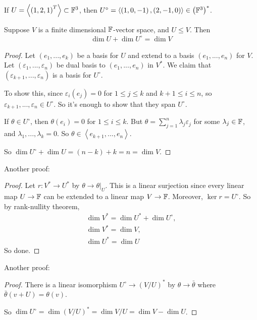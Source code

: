\documentclass[a4paper]{article}
\begin{document}
\begin{eg}
If $U=\left<\left(1,2,1\right)^T\right> \subset \mathbb{F}^3$, then $U^\circ = \left<\left(1,0,-1\right),\left(2,-1,0\right)\right> \in \left(\mathbb{F}^3\right)^*$.
\end{eg}

\begin{prop}
Suppose $V$ is a finite dimensional $\mathbb{F}$-vector space, and $U \leq V$. Then
\begin{equation*}
\begin{aligned}
\dim U + \dim U^\circ = \dim V
\end{aligned}
\end{equation*}
\begin{proof}
Let $\left(e_1,...,e_k\right)$ be a basis for $U$ and extend to a basis $\left(e_1,...,e_n\right)$ for $V$. Let $\left(\varepsilon_1,...,\varepsilon_n\right)$ be dual basis to $\left(e_1,...,e_n\right)$ in $V^*$. We claim that $\left(\varepsilon_{k+1},...,\varepsilon_n\right)$ is a basis for $U^\circ$.

To show this, since $\varepsilon_i\left(e_j\right) = 0$ for $1\leq j\leq k$ and $k+1 \leq i \leq n$, so $\varepsilon_{k+1},...,\varepsilon_n \in U^\circ$. So it's enough to show that they span $U^\circ$.

If $\theta\in U^\circ$, then $\theta\left(e_i\right) = 0$ for $1 \leq i \leq k$. But $\theta = \sum_{j=1}^n \lambda_j \varepsilon_j$ for some $\lambda_j \in \mathbb{F}$, and $\lambda_1,...,\lambda_k = 0$. So $\theta \in \left<e_{k+1},...,e_n\right>$.

So $\dim U^\circ + \dim U = \left(n-k\right)+k=n=\dim V$.
\end{proof}

Another proof:
\begin{proof}
Let $r: V^* \to U^*$ by $\theta \to \theta|_U$. This is a linear surjection since every linear map $U \to \mathbb{F}$ can be extended to a linear map $V \to \mathbb{F}$. Moreover, $\ker r = U^\circ$. So by rank-nullity theorem,
\begin{equation*}
\begin{aligned}
\dim V^* = \dim U^* + \dim U^\circ,\\
\dim V^* = \dim V,\\
\dim U^* = \dim U
\end{aligned}
\end{equation*}
So done.
\end{proof}

Another proof:
\begin{proof}
There is a linear isomorphism $U^\circ \to \left(V/U\right)^*$ by $\theta \to \bar{\theta}$ where $\bar{\theta}\left(v+U\right) = \theta\left(v\right)$.

So $\dim U^\circ = \dim\left(V/U\right)^* = \dim V/U = \dim V - \dim U$.
\end{proof}
\end{prop}
\end{document}
